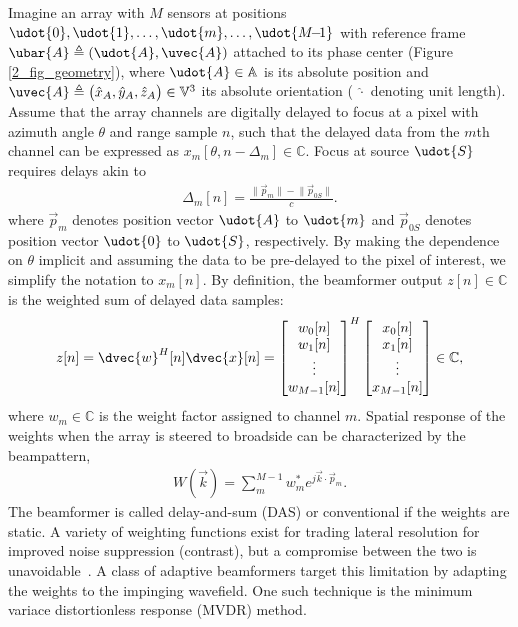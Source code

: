 {Imagine an array with $M$ sensors at positions $\udot{0},\udot{1},\dots, \udot{m}, \dots, \udot{M{\!-\!1}}$ with reference frame $\ubar{A} \triangleq (\udot{A},\uvec{A})$ attached to its phase center (Figure \ref{2_fig_geometry}), where $\udot{A}\in\mathbb{A}$ is its absolute position and $\uvec{A}\triangleq\big(\hat{x}_{A},\hat{y}_{A},\hat{z}_{A}\big)\in\mathbb{V}^3$ its absolute orientation ( $\hat{\cdot}$ denoting unit length). Assume that the array channels are 
digitally delayed to focus at a pixel with azimuth angle $\theta$ and range sample $n$, such that the delayed data from the $m$th channel can be expressed as $x_m[\theta,n-\Delta_m]\in\mathbb{C}$. Focus at source $\udot{S}$ requires delays akin to
%
\begin{align}
\Delta_m[n] = \frac{\lVert \vec{p}_{m}\rVert - \lVert \vec{p}_{0S}\rVert}{c}.\label{2_eq_delta}
\end{align}
%
where $\vec{p}_{m}$ denotes position vector $\udot{A}$ to $\udot{m}$ and $\vec{p}_{0S}$ denotes position vector $\udot{0}$ to $\udot{S}$, respectively. By making the dependence on $\theta$ implicit and assuming the data to be pre-delayed to the pixel of interest, we simplify the notation to $x_m[n]$. By definition, the beamformer output $z[n]\in\mathbb{C}$ is the weighted sum of delayed data samples:
%
\begin{align}
z[n] = \dvec{w}^H[n]\dvec{x}[n] = \bmat{w_0[n]\\w_1[n]\\\vdots\\w_{M-1}[n]}^H \bmat{x_0[n]\\x_1[n]\\\vdots\\x_{M-1}[n]} \in\mathbb{C},\label{2_eq_z}
\end{align}
%
where $w_m\in\mathbb{C}$ is the weight factor assigned to channel $m$. Spatial response of the weights when the array is steered to broadside can be characterized by the beampattern,
%
\begin{align}
W(\vec{k}) = \sum_m^{M-1} w_m^* e^{j\vec k \cdot \vec{p}_m}.\label{2_eq_beampattern}
\end{align}
%
%
%
%
%
The beamformer is called delay-and-sum (DAS) or conventional if the weights are static. A variety of weighting functions exist for trading lateral resolution for improved noise suppression (contrast), but a compromise between the two is unavoidable~\cite{Harris1978}. A class of adaptive beamformers target this limitation by adapting the weights to the impinging wavefield. One such technique is the minimum variace distortionless response (MVDR) method.


}
